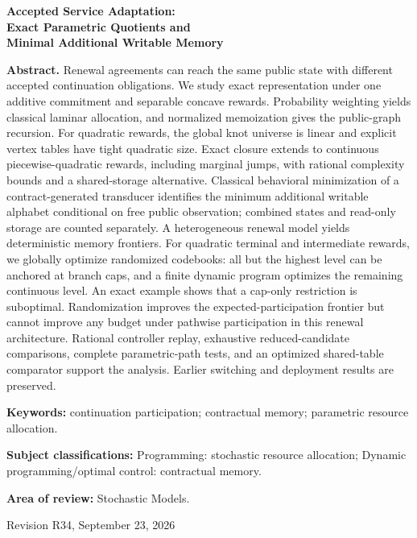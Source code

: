 \documentclass[11pt,letterpaper]{article}
\theoremstyle{definition}\newtheorem{assumption}[theorem]{Assumption}
\begin{document}
\hypersetup{pageanchor=false}
\begin{titlepage}\centering
{\Large\bfseries Accepted Service Adaptation:\\ Exact Parametric Quotients and\\ Minimal Additional Writable Memory\par}
\vspace{.35in}{Anonymous manuscript for Operations Research\par}\vspace{.25in}
\begin{minipage}{\textwidth}
\textbf{Abstract.} Renewal agreements can reach the same public state with different accepted continuation obligations. We study exact representation under one additive commitment and separable concave rewards. Probability weighting yields classical laminar allocation, and normalized memoization gives the public-graph recursion. For quadratic rewards, the global knot universe is linear and explicit vertex tables have tight quadratic size. Exact closure extends to continuous piecewise-quadratic rewards, including marginal jumps, with rational complexity bounds and a shared-storage alternative. Classical behavioral minimization of a contract-generated transducer identifies the minimum additional writable alphabet conditional on free public observation; combined states and read-only storage are counted separately. A heterogeneous renewal model yields deterministic memory frontiers. For quadratic terminal and intermediate rewards, we globally optimize randomized codebooks: all but the highest level can be anchored at branch caps, and a finite dynamic program optimizes the remaining continuous level. An exact example shows that a cap-only restriction is suboptimal. Randomization improves the expected-participation frontier but cannot improve any budget under pathwise participation in this renewal architecture. Rational controller replay, exhaustive reduced-candidate comparisons, complete parametric-path tests, and an optimized shared-table comparator support the analysis. Earlier switching and deployment results are preserved.
\par\vspace{.15in}\textbf{Keywords:} continuation participation; contractual memory; parametric resource allocation.
\par\vspace{.1in}\textbf{Subject classifications:} Programming: stochastic resource allocation; Dynamic programming/optimal control: contractual memory.
\par\vspace{.1in}\textbf{Area of review:} Stochastic Models.
\end{minipage}\vfill{Revision R34, September 23, 2026\par}
\end{titlepage}
\end{document}
